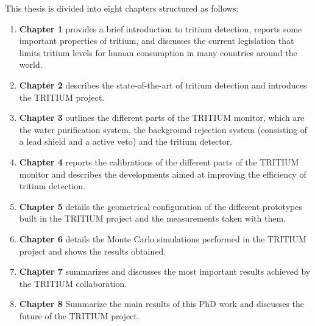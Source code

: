 This thesis is divided into eight chapters structured as follows:

\begin{enumerate}
\item{} \textbf{Chapter 1} provides a brief introduction to tritium detection, reports some important properties of tritium, and discusses the current legislation that limits tritium levels for human consumption in many countries around the world. 

\item{} \textbf{Chapter 2} describes the state-of-the-art of tritium detection and introduces the TRITIUM project. 

\item{} \textbf{Chapter 3} outlines the different parts of the TRITIUM monitor, which are the water purification system, the background rejection system (consisting of a lead shield and a active veto)  and the tritium detector. 

\item{} \textbf{Chapter 4} reports the calibrations of the different parts of the TRITIUM monitor and describes the developments aimed at improving the efficiency of tritium detection. 

\item{} \textbf{Chapter 5} details the geometrical configuration of the different prototypes built in the TRITIUM project and the measurements taken with them. 

\item{} \textbf{Chapter 6} details the Monte Carlo simulations performed in the TRITIUM project and shows the results obtained. 

\item{} \textbf{Chapter 7} summarizes and discusses the most important results achieved by the TRITIUM collaboration.

\item{} \textbf{Chapter 8} Summarize the main results of this PhD work and discusses the future of the TRITIUM project.

\end{enumerate}

